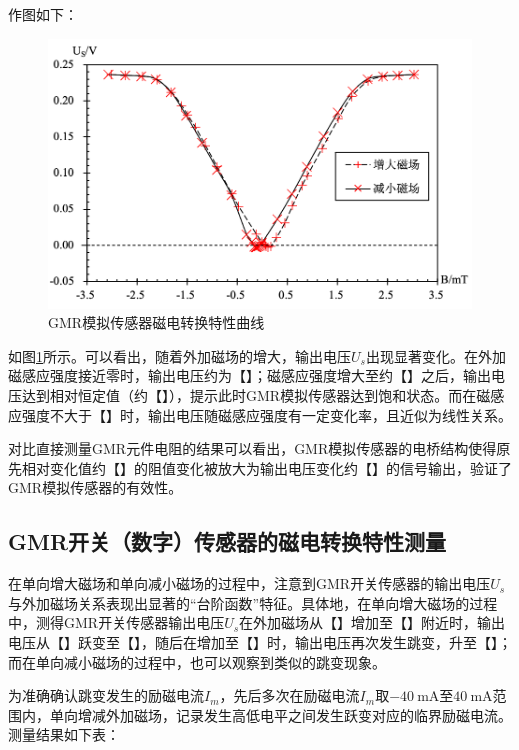 \documentclass{thuemp}
\begin{document}
作图如下：

\begin{figure}[H]
    \centering
    \includegraphics[width=1.0\linewidth]{../Data/GMR-Plot-02-excel.png}
    \caption{GMR模拟传感器磁电转换特性曲线} \label{fig:gmrsensor}
\end{figure}

如图\ref{fig:gmrsensor}所示。可以看出，随着外加磁场的增大，输出电压$U_s$出现显著变化。在外加磁感应强度接近零时，输出电压约为【】；磁感应强度增大至约【】之后，输出电压达到相对恒定值（约【】），提示此时GMR模拟传感器达到饱和状态。而在磁感应强度不大于【】时，输出电压随磁感应强度有一定变化率，且近似为线性关系。

对比直接测量GMR元件电阻的结果可以看出，GMR模拟传感器的电桥结构使得原先相对变化值约【】的阻值变化被放大为输出电压变化约【】的信号输出，验证了GMR模拟传感器的有效性。

\subsection{GMR开关（数字）传感器的磁电转换特性测量}

在单向增大磁场和单向减小磁场的过程中，注意到GMR开关传感器的输出电压$U_s$与外加磁场关系表现出显著的“台阶函数”特征。具体地，在单向增大磁场的过程中，测得GMR开关传感器输出电压$U_s$在外加磁场从【】增加至【】附近时，输出电压从【】跃变至【】，随后在增加至【】时，输出电压再次发生跳变，升至【】；而在单向减小磁场的过程中，也可以观察到类似的跳变现象。

为准确确认跳变发生的励磁电流$I_m$，先后多次在励磁电流$I_m$取$-40 ~ \mathrm{mA}$至$40 ~ \mathrm{mA}$范围内，单向增减外加磁场，记录发生高低电平之间发生跃变对应的临界励磁电流。测量结果如下表：
\end{document}
